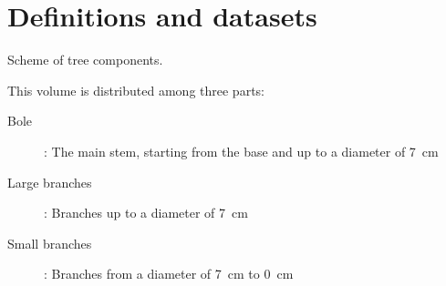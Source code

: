 \chapter{Definitions and datasets\label{chap::def}}

\begin{marginfigure}%
	
	\caption{Scheme of tree components.\label{fig::ign_tree}}
\end{marginfigure}

This volume is distributed among three parts:
\begin{description}
	\item[Bole]: The main stem, starting from the base and up to a diameter of \SI{7}{\centi\metre}
	\item[Large branches]: Branches up to a diameter of \SI{7}{\centi\metre}
	\item[Small branches]: Branches from a diameter of \SI{7}{\centi\metre} to \SI{0}{\centi\metre}
\end{description}



% 	

